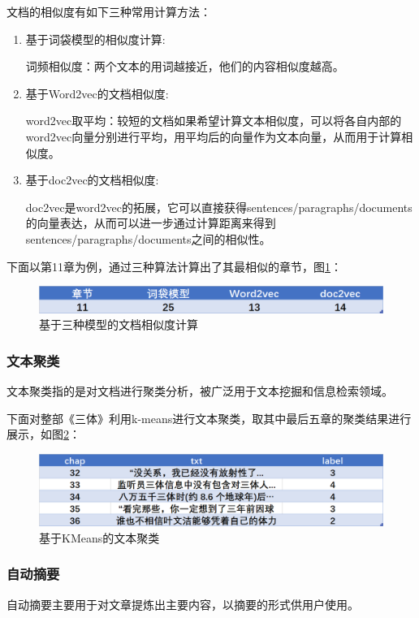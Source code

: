 \documentclass[12pt]{xjtureport}
\begin{document}
文档的相似度有如下三种常用计算方法：

\begin{enumerate}
    \item 基于词袋模型的相似度计算:
    
    词频相似度：两个文本的用词越接近，他们的内容相似度越高。

    \item 基于Word2vec的文档相似度:
    
    word2vec取平均：较短的文档如果希望计算文本相似度，可以将各自内部的word2vec向量分别进行平均，用平均后的向量作为文本向量，从而用于计算相似度。

    \item 基于doc2vec的文档相似度:
    
    doc2vec是word2vec的拓展，它可以直接获得sentences/paragraphs/documents的向量表达，从而可以进一步通过计算距离来得到sentences/paragraphs/documents之间的相似性。

\end{enumerate}

下面以第11章为例，通过三种算法计算出了其最相似的章节，图\ref{Doc}：
\begin{figure}[!htbp]
    \centering
    \includegraphics[width=0.8\linewidth]{figures/文档相似度.jpg}
    \caption{基于三种模型的文档相似度计算}
    \label{Doc}
\end{figure}

\subsubsection{文本聚类}
文本聚类指的是对文档进行聚类分析，被广泛用于文本挖掘和信息检索领域。

下面对整部《三体》利用k-means进行文本聚类，取其中最后五章的聚类结果进行展示，如图\ref{KMeans}：
\begin{figure}[!htbp]
    \centering
    \includegraphics[width=0.8\linewidth]{figures/文本聚类.jpg}
    \caption{基于KMeans的文本聚类}
    \label{KMeans}
\end{figure}

\subsubsection{自动摘要}
自动摘要主要用于对文章提炼出主要内容，以摘要的形式供用户使用。
\end{document}
